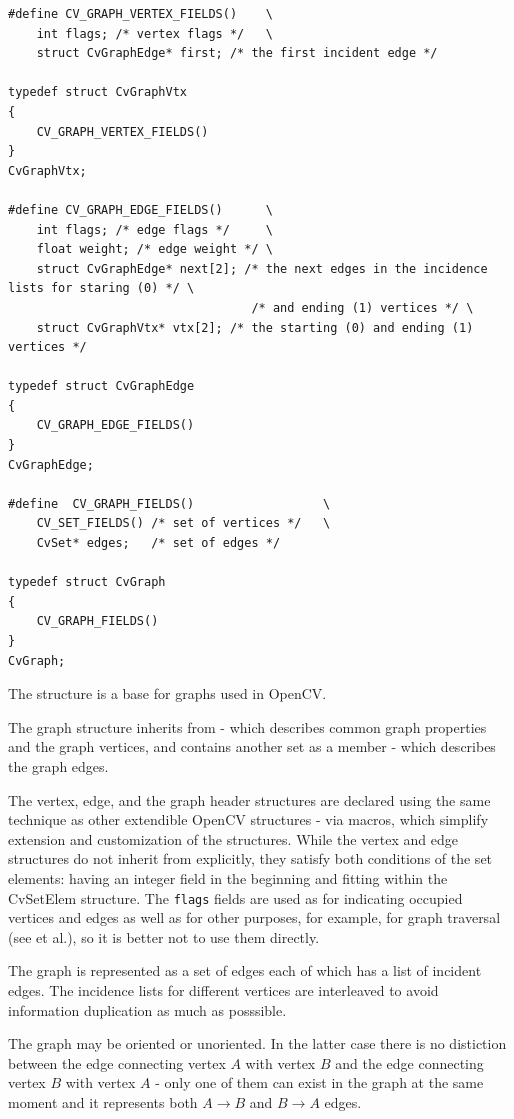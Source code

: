 \begin{lstlisting}
#define CV_GRAPH_VERTEX_FIELDS()    \
    int flags; /* vertex flags */   \
    struct CvGraphEdge* first; /* the first incident edge */

typedef struct CvGraphVtx
{
    CV_GRAPH_VERTEX_FIELDS()
}
CvGraphVtx;

#define CV_GRAPH_EDGE_FIELDS()      \
    int flags; /* edge flags */     \
    float weight; /* edge weight */ \
    struct CvGraphEdge* next[2]; /* the next edges in the incidence lists for staring (0) */ \
                                  /* and ending (1) vertices */ \
    struct CvGraphVtx* vtx[2]; /* the starting (0) and ending (1) vertices */

typedef struct CvGraphEdge
{
    CV_GRAPH_EDGE_FIELDS()
}
CvGraphEdge;

#define  CV_GRAPH_FIELDS()                  \
    CV_SET_FIELDS() /* set of vertices */   \
    CvSet* edges;   /* set of edges */

typedef struct CvGraph
{
    CV_GRAPH_FIELDS()
}
CvGraph;

\end{lstlisting}

The structure  is a base for graphs used in OpenCV.

The graph structure inherits from  - which describes common graph properties and the graph vertices, and contains another set as a member - which describes the graph edges.

The vertex, edge, and the graph header structures are declared using the
same technique as other extendible OpenCV structures - via macros, which
simplify extension and customization of the structures. While the vertex
and edge structures do not inherit from  explicitly, they
satisfy both conditions of the set elements: having an integer field in
the beginning and fitting within the CvSetElem structure. The \texttt{flags} fields are
used as for indicating occupied vertices and edges as well as for other
purposes, for example, for graph traversal (see \cvCPyCross{CreateGraphScanner}
et al.), so it is better not to use them directly.

The graph is represented as a set of edges each of which has a list of
incident edges. The incidence lists for different vertices are interleaved
to avoid information duplication as much as posssible.

The graph may be oriented or unoriented. In the latter case there is no
distiction between the edge connecting vertex $A$ with vertex $B$ and the edge
connecting vertex $B$ with vertex $A$ - only one of them can exist in the
graph at the same moment and it represents both $A \rightarrow B$ and
$B \rightarrow A$ edges.


